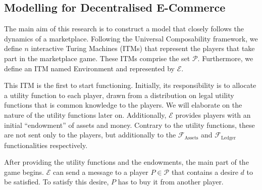 \subsection{Modelling for Decentralised E-Commerce}
  The main aim of this research is to construct a model that closely follows the dynamics
  of a marketplace. Following the Universal Composability framework, we define $n$
  interactive Turing Machines (ITMs) that represent the players that take part in the
  marketplace game. These ITMs comprise the set $\mathcal{P}$. Furthermore, we define an
  ITM named Environment and represented by $\mathcal{E}$.
  
  This ITM is the first to start functioning. Initially, its responsibility is to allocate
  a utility function to each player, drawn from a distribution on legal utility functions
  that is common knowledge \cite{knowledge} to the players. We will elaborate on the
  nature of the utility functions later on. Additionally, $\mathcal{E}$ provides players
  with an initial ``endowment'' of assets and money. Contrary to the utility functions,
  these are not sent only to the players, but additionally to the
  $\mathcal{F}_{\mathrm{Assets}}$ and $\mathcal{F}_{\mathrm{Ledger}}$ functionalities
  respectively.
  
  After providing the utility functions and the endowments, the main part of the game
  begins. $\mathcal{E}$ can send a message to a player $P \in \mathcal{P}$ that contains a
  desire $d$ to be satisfied. To satisfy this desire, $P$ has to buy it from another
  player.
